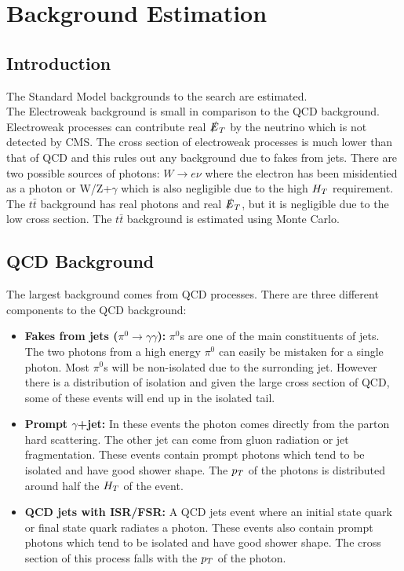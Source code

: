 \chapter{Background Estimation}

\section{Introduction}

The Standard Model backgrounds to the search are estimated. \\

The Electroweak background is small in comparison to the QCD background.
Electroweak processes can contribute real $\slashed{E}_{T}$ by the neutrino which is not
detected by CMS. The cross section of electroweak processes is much lower than
that of QCD and this rules out any background due to fakes from jets. There are
two possible sources of photons: $W\rightarrow e\nu$ where the electron has been
misidentied as a photon or W/Z+$\gamma$ which is also negligible due to the high
$H_{T}$ requirement. \\

The $t\bar{t}$ background has real photons and real $\slashed{E}_{T}$, but it is negligible 
due to the low cross section. The $t\bar{t}$ background is estimated using Monte
Carlo.
 
\section{QCD Background}
\label{sec:QCD_Background}

The largest background comes from QCD processes. There are three different 
components to the QCD background:

\begin{itemize}
\item {\bf Fakes from jets ($\pi^{0}\rightarrow\gamma\gamma$):} $\pi^{0}$s are
one of the main constituents of jets. The two photons from a high energy 
$\pi^{0}$ can easily be mistaken for a single photon. Most $\pi^{0}$s will be 
non-isolated due to the surronding jet. However there is a distribution of 
isolation and given the large cross section of QCD, some of these events will 
end up in the isolated tail.
\item {\bf Prompt $\gamma$+jet:} In these events the photon comes directly from
the parton hard scattering. The other jet can come from gluon radiation or
jet fragmentation. These events contain prompt photons which tend to be isolated
and have good shower shape. The $p_{T}$ of the photons is distributed around half
the $H_{T}$ of the event.
\item {\bf QCD jets with ISR/FSR:} A QCD jets event where an initial state quark
or final state quark radiates a photon. These events also contain prompt photons
which tend to be isolated and have good shower shape. The cross section of this 
process falls with the $p_{T}$ of the photon. 
\end{itemize}

